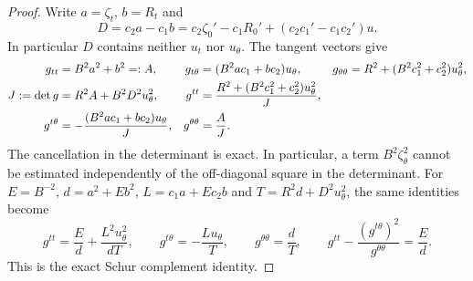 \begin{proof}
Write $a=\zeta_t$, $b=R_t$ and
\begin{equation}
 D=c_2a-c_1b
  =c_2\zeta_0'-c_1R_0'+(c_2c_1'-c_1c_2')u.
 \label{gauge:transverse}
\end{equation}
In particular $D$ contains neither $u_t$ nor $u_\theta$.
The tangent vectors give
\begin{align}
 g_{tt}&=B^2a^2+b^2=:A,
 &g_{t\theta}&=(B^2ac_1+bc_2)u_\theta,
 &g_{\theta\theta}&=R^2+(B^2c_1^2+c_2^2)u_\theta^2,\notag\\
 J:=\det g&=R^2A+B^2D^2u_\theta^2,
 &g^{tt}&=\frac{R^2+(B^2c_1^2+c_2^2)u_\theta^2}{J},\notag\\
 g^{t\theta}&=-\frac{(B^2ac_1+bc_2)u_\theta}{J},
 &g^{\theta\theta}&=\frac A J.
 \label{gauge:metric}
\end{align}
The cancellation in the determinant is exact.  In particular, a term
$B^2\zeta_\theta^2$ cannot be estimated independently of the off-diagonal
square in the determinant.  For $E=B^{-2}$, $d=a^2+Eb^2$,
$L=c_1a+Ec_2b$ and $T=R^2d+D^2u_\theta^2$, the same identities become
\begin{equation}
 g^{tt}=\frac E d+\frac{L^2u_\theta^2}{dT},\qquad
 g^{t\theta}=-\frac{Lu_\theta}{T},\qquad
 g^{\theta\theta}=\frac dT,\qquad
 g^{tt}-\frac{(g^{t\theta})^2}{g^{\theta\theta}}=\frac E d.
 \label{gauge:schur}
\end{equation}
This is the exact Schur complement identity.


\end{proof}
